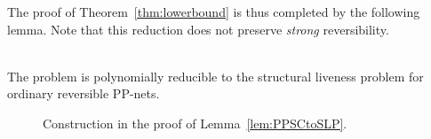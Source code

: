 \noindent
The proof of Theorem~\ref{thm:lowerbound} is thus completed by the following lemma.
Note that this reduction does not preserve \emph{strong}
reversibility.

\begin{lem}\label{lem:PPSCtoSLP}
\hfill\\
	The \PPSCover problem is polynomially reducible to the structural
	liveness problem for ordinary reversible PP-nets.
\end{lem}
\begin{figure}[t]
\begin{center}

\caption{Construction in the proof of
Lemma~\ref{lem:PPSCtoSLP}.}\label{fig:covtoslp}
\end{center}
\end{figure}


